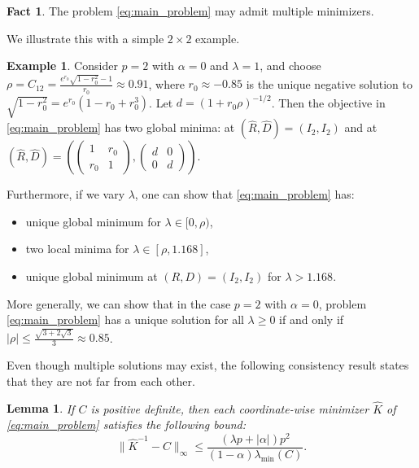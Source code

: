 \documentclass[12pt]{amsart}
\numberwithin{equation}{section}
\numberwithin{equation}{section}
\theoremstyle{plain}
\newtheorem{lemma}{Lemma}
\theoremstyle{definition}
\newtheorem{example}{Example}
\newtheorem{fact}{Fact}
\begin{document}
\begin{fact}
     The problem \eqref{eq:main_problem} may admit multiple minimizers.
\end{fact}
We illustrate this with a simple $2\times 2$ example. 
 \begin{example}\label{ex:2on2}
Consider $p=2$ with $\alpha=0$ and $\lambda=1$, and choose $\rho=C_{12}=\frac{e^{r_0}\sqrt{1-r_0^2}-1}{r_0}\approx 0.91$, where $r_0\approx -0.85$ is the unique negative solution to 
$\sqrt{1-r_0^2} = e^{r_0} (1-r_0+r_0^3)$. Let $d=(1+r_0 \rho)^{-1/2}$. 
Then the objective in \eqref{eq:main_problem} has two global minima: at $(\hat{R},\hat{D})=(I_2,I_2)$ and at 
\(
(\hat{R},\hat{D})=\left( \begin{pmatrix}
    1 & r_0 \\ r_0 & 1
\end{pmatrix}, \begin{pmatrix} d & 0 \\ 0 & d \end{pmatrix}
\right).
\)

Furthermore, if we vary $\lambda$,  one can show that \eqref{eq:main_problem} has:
\begin{itemize}
\item unique global minimum for $\lambda\in[0,\rho)$,
\item two local minima for $\lambda \in[\rho, 1.168]$,
\item unique global minimum at $(R,D)=(I_2,I_2)$ for $\lambda> 1.168$.
\end{itemize} 
More generally, we can show that in the case $p=2$ with $\alpha=0$, problem \eqref{eq:main_problem} has a unique solution for all $\lambda \geq 0$ if and only if $|\rho|\leq \frac{\sqrt{3+2\sqrt{3}}}{3}\approx 0.85$.
 \end{example}




Even though multiple solutions may exist, the following consistency result states that they are not far from each other.
\begin{lemma}\label{lem:cons}
If $C$ is positive definite, then each coordinate-wise minimizer $\hat{K}$ of \eqref{eq:main_problem} satisfies the following bound:
\[
\| \hat{K}^{-1}-C\|_\infty  \leq  \frac{(\lambda p +|\alpha|)p^2}{(1-\alpha)\lambda_{\min}(C)}.
\]
\end{lemma}
\end{document}
